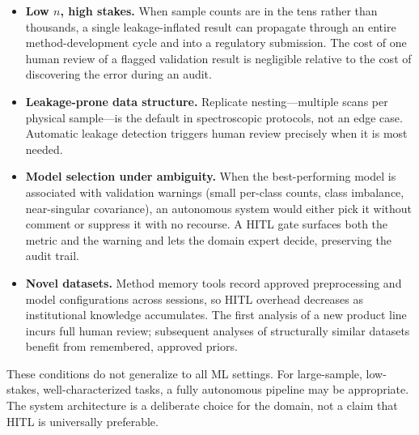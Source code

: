 \begin{itemize}
  \item \textbf{Low $n$, high stakes.} When sample counts are in the tens
    rather than thousands, a single leakage-inflated result can propagate
    through an entire method-development cycle and into a regulatory
    submission.
    The cost of one human review of a flagged validation result is negligible
    relative to the cost of discovering the error during an audit.
  \item \textbf{Leakage-prone data structure.} Replicate nesting---multiple
    scans per physical sample---is the default in spectroscopic protocols, not
    an edge case.
    Automatic leakage detection triggers human review precisely when it is
    most needed.
  \item \textbf{Model selection under ambiguity.} When the best-performing
    model is associated with validation warnings (small per-class counts,
    class imbalance, near-singular covariance), an autonomous system would
    either pick it without comment or suppress it with no recourse.
    A HITL gate surfaces both the metric and the warning and lets the
    domain expert decide, preserving the audit trail.
  \item \textbf{Novel datasets.} Method memory tools record approved
    preprocessing and model configurations across sessions, so HITL overhead
    decreases as institutional knowledge accumulates.
    The first analysis of a new product line incurs full human review;
    subsequent analyses of structurally similar datasets benefit from
    remembered, approved priors.
\end{itemize}

These conditions do not generalize to all ML settings.
For large-sample, low-stakes, well-characterized tasks, a fully autonomous
pipeline may be appropriate.
The system architecture is a deliberate choice for the domain, not a
claim that HITL is universally preferable.
